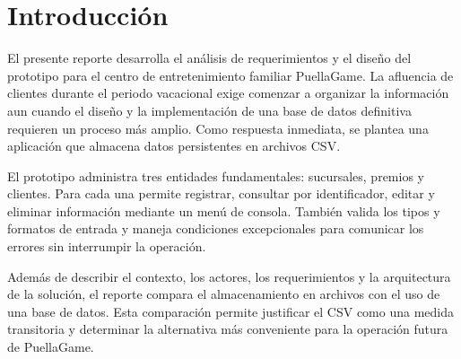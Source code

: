 \section{Introducción}

El presente reporte desarrolla el análisis de requerimientos y el diseño del
prototipo para el centro de entretenimiento familiar PuellaGame. La afluencia de
clientes durante el periodo vacacional exige comenzar a organizar la
información aun cuando el diseño y la implementación de una base de datos
definitiva requieren un proceso más amplio. Como respuesta inmediata, se plantea
una aplicación que almacena datos persistentes en archivos CSV.

El prototipo administra tres entidades fundamentales: sucursales, premios y
clientes. Para cada una permite registrar, consultar por identificador, editar y
eliminar información mediante un menú de consola. También valida los tipos y
formatos de entrada y maneja condiciones excepcionales para comunicar los
errores sin interrumpir la operación.

Además de describir el contexto, los actores, los requerimientos y la
arquitectura de la solución, el reporte compara el almacenamiento en archivos
con el uso de una base de datos. Esta comparación permite justificar el CSV como
una medida transitoria y determinar la alternativa más conveniente para la
operación futura de PuellaGame.
